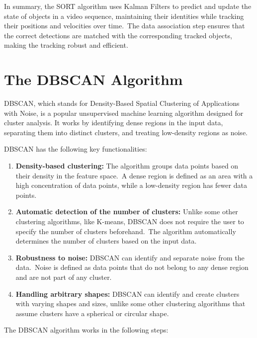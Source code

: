 In summary, the SORT algorithm uses Kalman Filters to predict and update the state of objects in a video sequence, maintaining their identities while tracking their positions and velocities over time.\ The data association step ensures that the correct detections are matched with the corresponding tracked objects, making the tracking robust and efficient.


\section{The DBSCAN Algorithm}
\label{sec:dbscan}

DBSCAN, which stands for Density-Based Spatial Clustering of Applications with Noise, is a popular unsupervised machine learning algorithm designed for cluster analysis.
It works by identifying dense regions in the input data, separating them into distinct clusters, and treating low-density regions as noise.

DBSCAN has the following key functionalities:

\begin{enumerate}
    \item \textbf{Density-based clustering:} The algorithm groups data points based on their density in the feature space.\ A dense region is defined as an area with a high concentration of data points, while a low-density region has fewer data points.
    \item \textbf{Automatic detection of the number of clusters:} Unlike some other clustering algorithms, like K-means, DBSCAN does not require the user to specify the number of clusters beforehand.\ The algorithm automatically determines the number of clusters based on the input data.
    \item \textbf{Robustness to noise:} DBSCAN can identify and separate noise from the data.\ Noise is defined as data points that do not belong to any dense region and are not part of any cluster.
    \item \textbf{Handling arbitrary shapes:} DBSCAN can identify and create clusters with varying shapes and sizes, unlike some other clustering algorithms that assume clusters have a spherical or circular shape.
\end{enumerate}

The DBSCAN algorithm works in the following steps:


